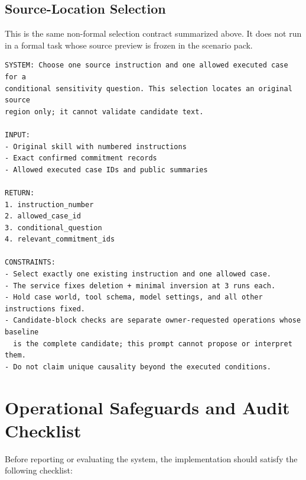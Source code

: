 \subsection{Source-Location Selection}
\label{app:prompt-probe}

This is the same non-formal selection contract summarized above. It does not run in a formal task whose source preview is frozen in the scenario pack.

\begin{lstlisting}[basicstyle=\ttfamily\footnotesize,breaklines=true,frame=single]
SYSTEM: Choose one source instruction and one allowed executed case for a
conditional sensitivity question. This selection locates an original source
region only; it cannot validate candidate text.

INPUT:
- Original skill with numbered instructions
- Exact confirmed commitment records
- Allowed executed case IDs and public summaries

RETURN:
1. instruction_number
2. allowed_case_id
3. conditional_question
4. relevant_commitment_ids

CONSTRAINTS:
- Select exactly one existing instruction and one allowed case.
- The service fixes deletion + minimal inversion at 3 runs each.
- Hold case world, tool schema, model settings, and all other instructions fixed.
- Candidate-block checks are separate owner-requested operations whose baseline
  is the complete candidate; this prompt cannot propose or interpret them.
- Do not claim unique causality beyond the executed conditions.
\end{lstlisting}

\section{Operational Safeguards and Audit Checklist}
\label{app:system-safeguards}

Before reporting or evaluating the system, the implementation should satisfy the following checklist:

